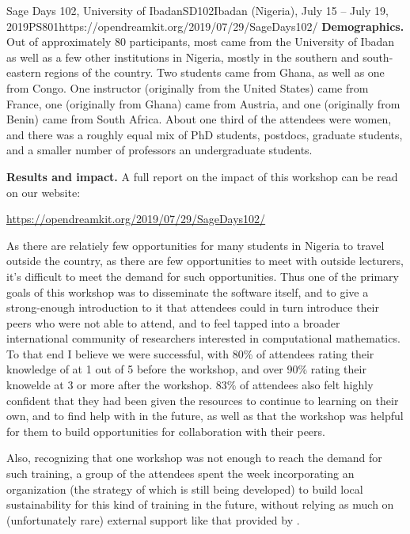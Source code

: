 \begin{event}{Sage Days 102, University of Ibadan}{SD102}{Ibadan (Nigeria), July 15 -- July 19, 2019}{PS}{80}{1}{https://opendreamkit.org/2019/07/29/SageDays102/}
\textbf{Demographics.} Out of approximately 80 participants, most came from the
University of Ibadan as well as a few other institutions in Nigeria,
mostly in the southern and south-eastern regions of the country.  Two
students came from Ghana, as well as one from Congo.  One instructor
(originally from the United States) came from France, one (originally
from Ghana) came from Austria, and one (originally from Benin) came
from South Africa.  About one third of the attendees were women, and
there was a roughly equal mix of PhD students, postdocs, graduate
students, and a smaller number of professors an undergraduate students.

\textbf{Results and impact.} A full report on the impact of this
workshop can be read on our website:
\centerline{\url{https://opendreamkit.org/2019/07/29/SageDays102/}}

As there are relatiely few opportunities for many students in Nigeria to travel
outside the country, as there are few opportunities to meet with
outside lecturers, it's difficult to meet the demand for such
opportunities. Thus one of the primary goals of this workshop was to
disseminate the software itself, and to give a strong-enough
introduction to it that attendees could in turn introduce their peers
who were not able to attend, and to feel tapped into a broader
international community of researchers interested in computational
mathematics. To that end I believe we were successful, with 80\% of
attendees rating their knowledge of \Sage at 1 out of 5 before the
workshop, and over 90\% rating their knowelde at 3 or more after the
workshop.  83\% of attendees also felt highly confident that they had
been given the resources to continue to learning on their own, and to
find help with \Sage in the future, as well as that the workshop was
helpful for them to build opportunities for collaboration with their
peers.

Also, recognizing that one workshop was not enough to reach the demand for such
training, a group of the attendees spent the week incorporating an
organization (the strategy of which is still being developed) to build
local sustainability for this kind of training in the future, without
relying as much on (unfortunately rare) external support like that provided
by \ODK.



\end{event}
